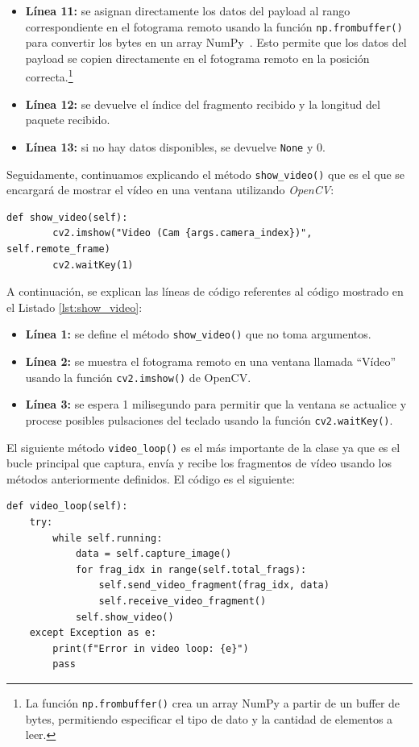 \begin{itemize}
    \item \textbf{Línea 11:} se asignan directamente los datos del payload al rango correspondiente en el fotograma remoto usando la función \texttt{np.frombuffer()} para convertir los bytes en un array NumPy~\cite{numpy}. Esto permite que los datos del payload se copien directamente en el fotograma remoto en la posición correcta.\footnote{La función \texttt{np.frombuffer()} crea un array NumPy a partir de un buffer de bytes, permitiendo especificar el tipo de dato y la cantidad de elementos a leer.}
    \item \textbf{Línea 12:} se devuelve el índice del fragmento recibido y la longitud del paquete recibido.
    \item \textbf{Línea 13:} si no hay datos disponibles, se devuelve \texttt{None} y 0.
\end{itemize}
\vspace{\baselineskip}

Seguidamente, continuamos explicando el método \texttt{show\_video()} que es el que se encargará de mostrar el vídeo en una ventana utilizando \textit{OpenCV}:
\begin{lstlisting}[style=pythonstyle, caption={Método \texttt{show\_video()} de \textit{Minimal\_Video}.}, label={lst:show_video}]
    def show_video(self):
        cv2.imshow("Video (Cam {args.camera_index})", self.remote_frame)
        cv2.waitKey(1)
\end{lstlisting}

A continuación, se explican las líneas de código referentes al código mostrado en el Listado \ref{lst:show_video}:
\begin{itemize}
    \item \textbf{Línea 1:} se define el método \texttt{show\_video()} que no toma argumentos.
    \item \textbf{Línea 2:} se muestra el fotograma remoto en una ventana llamada ``Vídeo'' usando la función \texttt{cv2.imshow()} de OpenCV.
    \item \textbf{Línea 3:} se espera 1 milisegundo para permitir que la ventana se actualice y procese posibles pulsaciones del teclado usando la función \texttt{cv2.waitKey()}.
\end{itemize}
\vspace{\baselineskip}

El siguiente método \texttt{video\_loop()} es el más importante de la clase ya que es el bucle principal que captura, envía y recibe los fragmentos de vídeo usando los métodos anteriormente definidos. El código es el siguiente:
\begin{lstlisting}[style=pythonstyle, caption={Método \texttt{video\_loop()} de \textit{Minimal\_Video}.}, label={lst:video_loop_minimal_video}]
def video_loop(self):
    try:
        while self.running:
            data = self.capture_image()
            for frag_idx in range(self.total_frags):
                self.send_video_fragment(frag_idx, data)
                self.receive_video_fragment()
            self.show_video()
    except Exception as e:
        print(f"Error in video loop: {e}")
        pass
\end{lstlisting}

